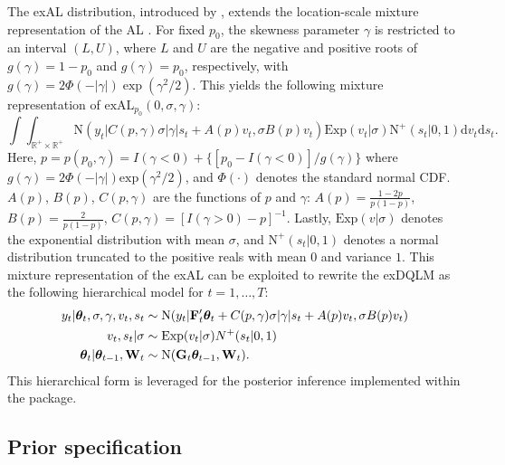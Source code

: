 \documentclass[jss]{jss}
\begin{document}
The exAL distribution, introduced by \cite{yan2025family}, extends the location-scale mixture representation of the AL \citep{kozumi2011gibbs}. For fixed $p_0$, the skewness parameter $\gamma$ is restricted to an interval $(L,U)$, where $L$ and $U$ are the negative and positive roots of $g(\gamma) = 1-p_0$ and $g(\gamma) = p_0$, respectively, with $g(\gamma) = 2\Phi(-|\gamma|)\exp(\gamma^2/2)$. This yields the following mixture representation of $\text{exAL}_{p_0}(0,\sigma,\gamma)$:
\begin{equation}
\label{EQ:exALmix}
\int\int_{\mathbb{R}^+ \times \mathbb{R}^+} \text{N}(y_t |  C(p,\gamma) \sigma |\gamma| s_t + A(p) v_t, \sigma B(p) v_t) \text{Exp}(v_t | \sigma) \text{N}^+(s_t| 0,1) \mathrm{d}v_t \mathrm{d}s_t.
\end{equation}
Here, $p = p(p_0,\gamma) = I(\gamma <0) + \{[p_0 - I(\gamma <0)]/g(\gamma) \}$ where $g(\gamma) = 2\Phi(-|\gamma|)\text{exp}(\gamma^2/2)$, and $\Phi(\cdot)$ denotes the standard normal CDF. $A(p)$, $B(p)$, $C(p,\gamma)$ are the functions of $p$ and $\gamma$: $A(p) = \frac{1-2p}{p(1-p)}$, $B(p) = \frac{2}{p(1-p)}$, $C(p,\gamma) = [I(\gamma>0) -p]^{-1}$. Lastly, $\text{Exp}(v | \sigma)$ denotes the exponential distribution with mean $\sigma$, and $\text{N}^+(s_t| 0,1)$ denotes a normal distribution truncated to the positive reals with mean $0$ and variance $1$. This mixture representation of the exAL can be exploited to rewrite the exDQLM as the following hierarchical model for $t=1,\dots,T$:
\begin{align}
\label{EQ:exDQLMobs}
y_t | \boldsymbol{\theta}_t,\sigma,\gamma,v_t,s_t  & \sim \text{N}(y_t | {\bf F}_t' \boldsymbol{\theta}_t + C(p,\gamma) \sigma |\gamma| s_t + A(p) v_t,\sigma B(p) v_t) \\
v_t, s_t | \sigma & \sim \text{Exp}(v_t | \sigma) N^+(s_t |0,1) \\
\label{EQ:exDQLMevo}
\boldsymbol{\theta}_t | \boldsymbol{\theta}_{t-1},{\bf W}_t & \sim  \text{N}({\bf G}_t \boldsymbol{\theta}_{t-1},{\bf W}_t).
\end{align}
This hierarchical form is leveraged for the posterior inference implemented within the  package.


\subsection{Prior specification}
\label{sec:priors}
\end{document}
